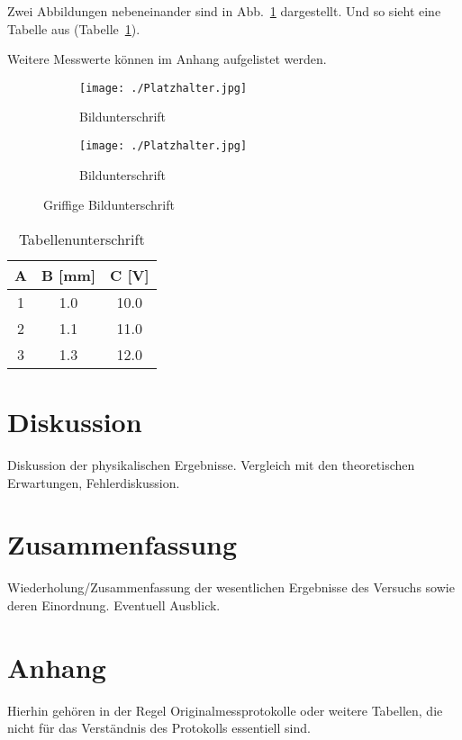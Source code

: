 \documentclass[12pt]{article}
\begin{document}
Zwei Abbildungen nebeneinander sind in Abb.~\ref{meinlabel2} dargestellt.
Und so sieht eine Tabelle aus (Tabelle~\ref{tabdummy}).

Weitere Messwerte k\"onnen im Anhang \label{anhang} aufgelistet werden.


\begin{figure}[h!]
  \centering
  \begin{subfigure}{0.49\textwidth}
    \texttt{[image: ./Platzhalter.jpg]}
    \caption{Bildunterschrift}
  \end{subfigure}
  \hfill
  \begin{subfigure}{0.49\textwidth}
    \texttt{[image: ./Platzhalter.jpg]}
    \caption{Bildunterschrift}
  \end{subfigure}
  \caption{Griffige Bildunterschrift}
  \label{meinlabel2}
\end{figure}



\begin{table}[h]
  \begin{center}
    \begin{tabular}{|c|c|c|}
      \hline
      A & B [mm] & C [V] \\
      \hline
      1 & 1.0 & 10.0 \\
      2 & 1.1 & 11.0 \\
      3 & 1.3 & 12.0 \\
      \hline
    \end{tabular}
    \caption{Tabellenunterschrift}
    \label{tabdummy}
  \end{center}
\end{table}%


\section{Diskussion}
Diskussion der physikalischen Ergebnisse.
Vergleich mit den theoretischen Erwartungen, Fehlerdiskussion.


\section{Zusammenfassung}
Wiederholung/Zusammenfassung der wesentlichen Ergebnisse des Versuchs sowie deren Einordnung. Eventuell Ausblick.


\thispagestyle{empty}



\clearpage
\appendix
\section{Anhang} \label{anhang}
Hierhin geh\"oren in der Regel Originalmessprotokolle oder weitere Tabellen, die nicht f\"ur das Verst\"andnis des Protokolls essentiell sind.
\end{document}

